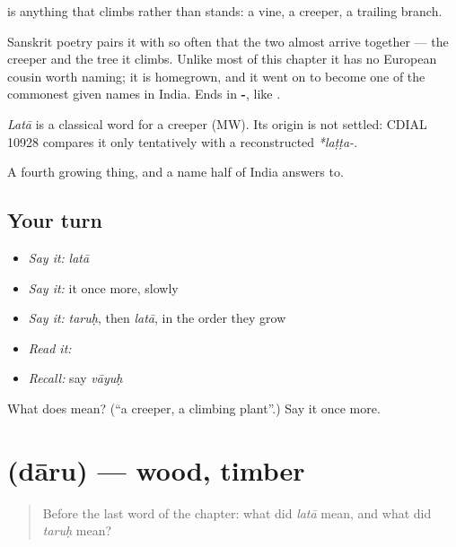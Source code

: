 \textbf{} is anything that climbs rather than stands: a vine, a creeper, a trailing branch.

Sanskrit poetry pairs it with \textbf{} so often that the two almost arrive together — the creeper and the tree it climbs. Unlike most of this chapter it has no European cousin worth naming; it is homegrown, and it went on to become one of the commonest given names in India. Ends in \textbf{-}, like \textbf{}.

\begin{cousinweb}
\emph{Latā} is a classical word for a creeper (MW). Its origin is not settled: CDIAL 10928 compares it only tentatively with a reconstructed \emph{*laṭṭa-}.
\end{cousinweb}

\begin{grammarlens}[title={What you've built}]
A fourth growing thing, and a name half of India answers to.
\end{grammarlens}

\subsection*{Your turn}
\begin{itemize}
\raggedright
  \item \emph{Say it:} \emph{latā}
  \item \emph{Say it:} it once more, slowly
  \item \emph{Say it:} \emph{taruḥ}, then \emph{latā}, in the order they grow
  \item \emph{Read it:} \textbf{}
  \item \emph{Recall:} say \emph{vāyuḥ}
\end{itemize}

\begin{tcolorbox}[breakable,colback=teal!4,colframe=teal!35!black,title={Before you move on}]
What does  mean? (\textquotedblleft{}a creeper, a climbing plant\textquotedblright{}.) Say it once more.
\end{tcolorbox}
\section[\texorpdfstring{\sk{दारु} (dāru)}{दारु (dāru)}]{ (dāru) — wood, timber}

\label{lesson:SA-C32-wood}



\begin{quote}
Before the last word of the chapter: what did \emph{latā} mean, and what did \emph{taruḥ} mean?
\end{quote}

